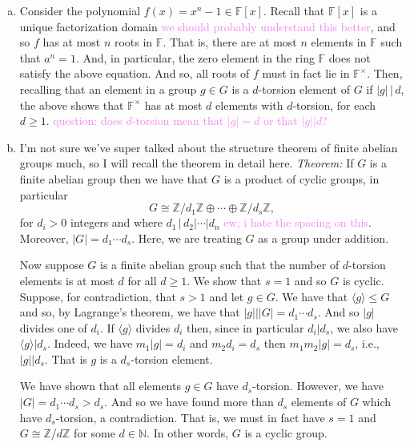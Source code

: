 \documentclass[12pt,letterpaper,boxed]{hmcpset}
\newcommand{\wg}[1]{\textcolor{violet}{#1}}
\newcommand{\Z}{\mathbb Z}
\newcommand{\abs}[1]{\left|#1\right|}
\newcommand{\anglee}[1]{\langle #1 \rangle}
\begin{document}
\begin{solution}

\begin{enumerate}[(a)]
\item Consider the polynomial $f(x) = x^n - 1 \in \mathbb F[x]$. 
Recall that $\mathbb F[x]$ is a unique factorization domain
\wg{we should probably understand this better}, and so $f$ has at most
$n$ roots in $\mathbb F$. That is, there are at most $n$ elements in
$\mathbb F$ such that $a^n = 1$. And, in particular, the zero element
in the ring $\mathbb F$ does not satisfy the above equation. And so,
all roots of $f$ must in fact lie in $\mathbb F^\times$. 
Then, recalling that an element in a group $g \in G$ is a $d$-torsion
element of $G$ if $\abs g \,\vert \, d$, the above shows that $\mathbb
F^\times$ has at most $d$ elements with $d$-torsion, for each $d \geq
1$. 
\wg{question: does $d$-torsion mean that $\abs g = d$ or that $\abs g \vert d$?}


\item I'm not sure we've super talked about the structure theorem of
finite abelian groups much, so I will recall the theorem in detail
here. \textit{Theorem:} If $G$ is a finite abelian group then we have
that $G$ is a product of cyclic groups, in particular
\[
	G \cong \Z / d_1 \Z \oplus \cdots \oplus \Z /d_s \Z,
\]
for $d_i > 0$ integers and where $d_1 \, \vert \, d_2 \vert \cdots \vert
d_n$ \wg{ew, i hate the spacing on this}. Moreover, $\abs G = d_1
\cdots d_s$. Here, we are treating $G$
as a group under addition. 

Now suppose $G$ is a finite abelian group such that the number of
$d$-torsion elements is at most $d$ for all $d \geq 1$. We show that
$s = 1$ and so $G$ is cyclic. Suppose, for contradiction,
that $s > 1$ and let $g \in G$.
We have that $\anglee g \leq G$ and so, by Lagrange's theorem, we have
that $\abs g \vert \abs G = d_1 \cdots d_s$. And so $\abs g$ divides
one of $d_i$. If $\anglee g$ divides $d_i$ then, since in particular
$d_i \vert d_s$, we also have $\anglee g \vert d_s$.
Indeed, we have $m_1 \abs g = d_i$ and $m_2 d_i = d_s$ then $m_1m_2
\abs g = d_s$, i.e., $\abs g \vert d_s$. That is $g$ is a
$d_s$-torsion element.

We have shown that all elements $g \in G$ have $d_s$-torsion.
However, we have $\abs G = d_1 \cdots d_s > d_s$. And
so we have found more than $d_s$ elements of $G$ which have
$d_s$-torsion, a contradiction. That is, we must in fact have $s=1$
and $G \cong
\Z/d\Z$ for some $d \in \mathbb N$. In other words, $G$ is a cyclic
group.


\end{enumerate}
\end{solution}
\end{document}
